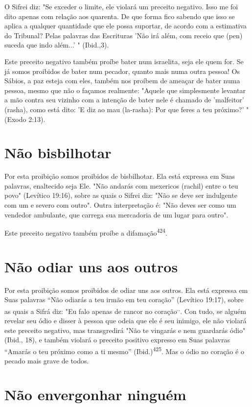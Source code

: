 O Sifrei diz: "Se exceder o limite, ele violará um preceito negativo.
Isso me foi dito apenas com relação aos quarenta. De que forma fico
sabendo que isso se aplica a qualquer quantidade que ele possa suportar,
de acordo com a estimativa do Tribunal? Pelas palavras das Escrituras
'Não irá além, com re­ceio que (pen) suceda que indo além...' "
(Ibid.,3).

Este preceito negativo também proíbe bater num israelita, seja ele quem
for. Se já somos proibidos de bater num pecador, quanto mais numa ou­tra
pessoa! Os Sábios, a paz esteja com eles, também nos proíbem de ameaçar
de bater numa pessoa, mesmo que não o façamos realmente: "Aquele que
sim­plesmente levantar a mão contra seu vizinho com a intenção de bater
nele é chamado de 'malfeitor' (rasha), como está dito: 'E diz ao mau
(la-rasha): Por que feres a teu próximo?' " (Exodo 2:13).

\section{Não bisbilhotar}

Por esta proibição somos proibidos de bisbilhotar. Ela está expressa em
Suas palavras, enaltecido seja Ele. "Não andarás com mexericos (rachil)
en­tre o teu povo" (Levítico 19:16), sobre as quais o Sifrei diz: "Não
se deve ser indulgente com um e severo com outro". Outra interpretação
é: "Não deves ser como um vendedor ambulante, que carrega sua mercadoria
de um lugar pa­ra outro".

Este preceito negativo também proíbe a difamação\textsuperscript{424}.

\section{Não odiar uns aos outros}

Por esta proibição somos proibidos de odiar uns aos outros. Ela está
expressa em Suas palavras ``Não odiarás a teu irmão em teu coração''
(Levítico 19:17), sobre as quais a Sifrá diz: "Eu falo apenas de rancor
no coração\textsuperscript{..}. Con tudo, se alguém revelar seu ódio e
disser à pessoa que odeia que ele é seu inimi­go, ele não violará este
preceito negativo, mas transgredirá "Não te vingarás e nem guardarás
ódio" (Ibid., 18), e também violará o preceito positivo expres­so em
Suas palavras ``Amarás o teu próximo como a ti mesmo''
(Ibid.)\textsuperscript{425}. Mas o ódio no coração é o pecado mais
grave de todos.

\section{Não envergonhar ninguém}

